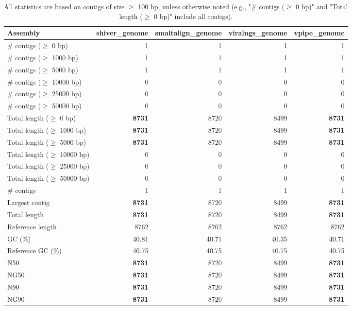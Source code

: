 \documentclass[12pt,a4paper]{article}
\begin{document}
\begin{table}[ht]
\begin{center}
\caption{All statistics are based on contigs of size $\geq$ 100 bp, unless otherwise noted (e.g., "\# contigs ($\geq$ 0 bp)" and "Total length ($\geq$ 0 bp)" include all contigs).}
\begin{tabular}{|l*{4}{|r}|}
\hline
Assembly & shiver\_genome & smaltalign\_genome & viralngs\_genome & vpipe\_genome \\ \hline
\# contigs ($\geq$ 0 bp) & 1 & 1 & 1 & 1 \\ \hline
\# contigs ($\geq$ 1000 bp) & 1 & 1 & 1 & 1 \\ \hline
\# contigs ($\geq$ 5000 bp) & 1 & 1 & 1 & 1 \\ \hline
\# contigs ($\geq$ 10000 bp) & 0 & 0 & 0 & 0 \\ \hline
\# contigs ($\geq$ 25000 bp) & 0 & 0 & 0 & 0 \\ \hline
\# contigs ($\geq$ 50000 bp) & 0 & 0 & 0 & 0 \\ \hline
Total length ($\geq$ 0 bp) & {\bf 8731} & 8720 & 8499 & {\bf 8731} \\ \hline
Total length ($\geq$ 1000 bp) & {\bf 8731} & 8720 & 8499 & {\bf 8731} \\ \hline
Total length ($\geq$ 5000 bp) & {\bf 8731} & 8720 & 8499 & {\bf 8731} \\ \hline
Total length ($\geq$ 10000 bp) & 0 & 0 & 0 & 0 \\ \hline
Total length ($\geq$ 25000 bp) & 0 & 0 & 0 & 0 \\ \hline
Total length ($\geq$ 50000 bp) & 0 & 0 & 0 & 0 \\ \hline
\# contigs & 1 & 1 & 1 & 1 \\ \hline
Largest contig & {\bf 8731} & 8720 & 8499 & {\bf 8731} \\ \hline
Total length & {\bf 8731} & 8720 & 8499 & {\bf 8731} \\ \hline
Reference length & 8762 & 8762 & 8762 & 8762 \\ \hline
GC (\%) & 40.81 & 40.71 & 40.35 & 40.71 \\ \hline
Reference GC (\%) & 40.75 & 40.75 & 40.75 & 40.75 \\ \hline
N50 & {\bf 8731} & 8720 & 8499 & {\bf 8731} \\ \hline
NG50 & {\bf 8731} & 8720 & 8499 & {\bf 8731} \\ \hline
N90 & {\bf 8731} & 8720 & 8499 & {\bf 8731} \\ \hline
NG90 & {\bf 8731} & 8720 & 8499 & {\bf 8731} \\ \hline

\end{tabular}
\end{center}
\end{table}
\end{document}
